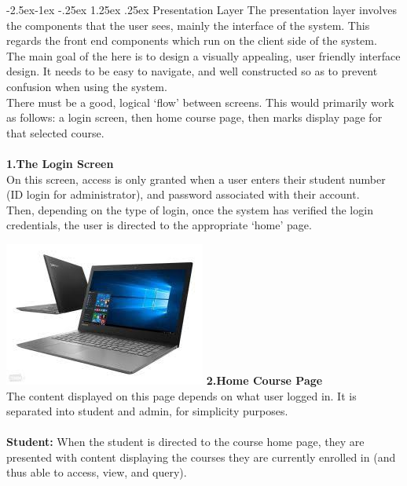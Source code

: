 \documentclass[paper=a4, fontsize=11pt]{scrartcl}
\makeatletter
\numberwithin{equation}{section}		%
\numberwithin{figure}{section}			%
\numberwithin{table}{section}				%
\renewcommand\paragraph{\@startsection{paragraph}{4}{\z@}%
            {-2.5ex\@plus -1ex \@minus -.25ex}%
            {1.25ex \@plus .25ex}%
            {\normalfont\normalsize\bfseries}}
\makeatother
\begin{document}
\paragraph{Presentation Layer}
The presentation layer involves the components that the user sees, mainly the interface of the system. This regards the front end components which run on the client side of the system.\\ The main goal of the here is to design a visually appealing, user friendly interface design. It needs to be easy to navigate, and well constructed so as to prevent confusion when using the system.\\ There must be a good, logical ‘flow’ between screens. This would primarily work as follows: a login screen, then home course page, then marks display page for that selected course.\\\\ \textbf{1.The Login Screen}\\On this screen, access is only granted when a user enters their student number (ID login for administrator), and password associated with their account.\\Then, depending on the type of login, once the system has verified the login credentials, the user is directed to the appropriate ‘home’ page.

\includegraphics[width = \textwidth]{img.jpeg}
\textbf{2.Home Course Page}\\The content displayed on this page depends on what user logged in. It is separated into student and admin, for simplicity purposes.\\\\\textbf{Student:} When the student is directed to the course home page, they are presented with content displaying the courses they are currently enrolled in (and thus able to access, view, and query).
\end{document}
